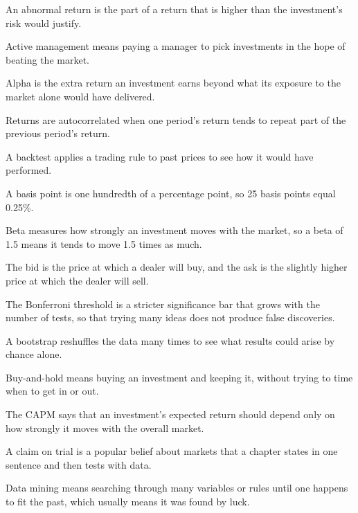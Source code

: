 \begin{keyterms}
\small
\begin{description}[leftmargin=0pt, itemsep=2pt, parsep=0pt, font=\normalfont\bfseries\color{FEMaroon}]
  \item[Abnormal return.] An abnormal return is the part of a return that is higher than the investment's risk would justify.
  \item[Active management.] Active management means paying a manager to pick investments in the hope of beating the market.
  \item[Alpha.] Alpha is the extra return an investment earns beyond what its exposure to the market alone would have delivered.
  \item[Autocorrelated returns.] Returns are autocorrelated when one period's return tends to repeat part of the previous period's return.
  \item[Backtest.] A backtest applies a trading rule to past prices to see how it would have performed.
  \item[Basis point.] A basis point is one hundredth of a percentage point, so 25 basis points equal 0.25\%.
  \item[Beta.] Beta measures how strongly an investment moves with the market, so a beta of 1.5 means it tends to move 1.5 times as much.
  \item[Bid and ask prices.] The bid is the price at which a dealer will buy, and the ask is the slightly higher price at which the dealer will sell.
  \item[Bonferroni threshold.] The Bonferroni threshold is a stricter significance bar that grows with the number of tests, so that trying many ideas does not produce false discoveries.
  \item[Bootstrap.] A bootstrap reshuffles the data many times to see what results could arise by chance alone.
  \item[Buy-and-hold.] Buy-and-hold means buying an investment and keeping it, without trying to time when to get in or out.
  \item[Capital Asset Pricing Model (CAPM).] The CAPM says that an investment's expected return should depend only on how strongly it moves with the overall market.
  \item[Claim on trial.] A claim on trial is a popular belief about markets that a chapter states in one sentence and then tests with data.
  \item[Data mining.] Data mining means searching through many variables or rules until one happens to fit the past, which usually means it was found by luck.

\end{description}
\end{keyterms}
